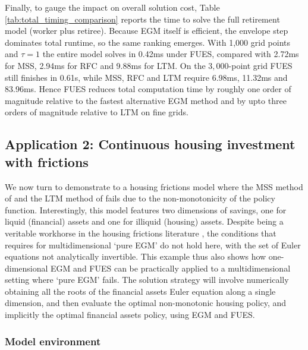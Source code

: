 \documentclass[12pt]{article}
\begin{document}


Finally, to gauge the impact on overall solution cost, Table \ref{tab:total_timing_comparison} reports the time to solve the full retirement model (worker plus retiree).
Because EGM itself is efficient, the envelope step dominates total runtime, so the same ranking emerges.
With 1,000 grid points and $\tau=1$ the entire model solves in 0.42ms under FUES, compared with 2.72ms for MSS, 2.94ms for RFC and 9.88ms for LTM.
On the $3,000$-point grid FUES still finishes in 0.61s, while MSS, RFC and LTM require 6.98ms, 11.32ms and 83.96ms.
Hence FUES reduces total computation time by roughly one order of magnitude relative to the fastest alternative EGM method and by upto three orders of magnitude relative to LTM on fine grids.




\subsection{Application 2: Continuous housing investment with frictions}\label{sec: app2_cont_hous}

We now turn to demonstrate to a housing frictions model where the MSS method of \cite{Iskhakov2017} and the LTM method of \cite{Druedahl2017} fails due to the non-monotonicity of the policy function. Interestingly, this model features two dimensions of savings, one for liquid (financial) assets and one for illiquid (housing) assets. Despite being a veritable workhorse in the housing frictions literature \citep{Kaplan2014, Yogo2016a, Dobrescu2022}, the conditions that \cite{Iskhakov2015} requires for multidimensional `pure EGM' do not hold here, with the set of Euler equations not analytically invertible. This example thus also shows how one-dimensional EGM and FUES can be practically applied to a multidimensional setting where `pure EGM' fails. The solution strategy will involve numerically obtaining all the roots of the financial assets Euler equation along a single dimension, and then evaluate the optimal non-monotonic housing policy, and implicitly the optimal financial assets policy, using EGM and FUES.



\subsubsection{Model environment}
\end{document}
